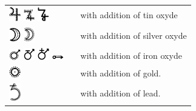 \documentclass[british,final,landscape]{scrartcl}
\begin{document}
\begin{refsection}
\begin{supertabular}{p{0.3\textwidth}p{0.34\textwidth}p{0.34\textwidth}}
   \includegraphics[width=5mm]{Mixtures/BezoardicumJoviale} \includegraphics[width=5mm]{Mixtures/BezoardicumJoviale2} \includegraphics[width=5mm]{Mixtures/BezoardicumJoviale3} &  &  with addition of tin oxyde \\
   \includegraphics[width=5mm]{Mixtures/BezoardicumLunare} \includegraphics[width=5mm]{Mixtures/BezoardicumLunare2} &   &  with addition of silver oxyde \\
   \includegraphics[width=5mm]{Mixtures/BezoardicumMartiale} \includegraphics[width=5mm]{Mixtures/BezoardicumMartiale2} \includegraphics[width=5mm]{Mixtures/BezoardicumMartiale3} \includegraphics[width=5mm]{Mixtures/BezoardicumMartiale4} &    &  with addition of iron oxyde \\
   \includegraphics[width=5mm]{Mixtures/BezoardicumSolare} &      &  with addition of gold. \\
   \includegraphics[width=5mm]{Mixtures/BezoardicumSaturninum} &   &  with addition of lead. \\

\end{supertabular}
\end{refsection}
\end{document}
